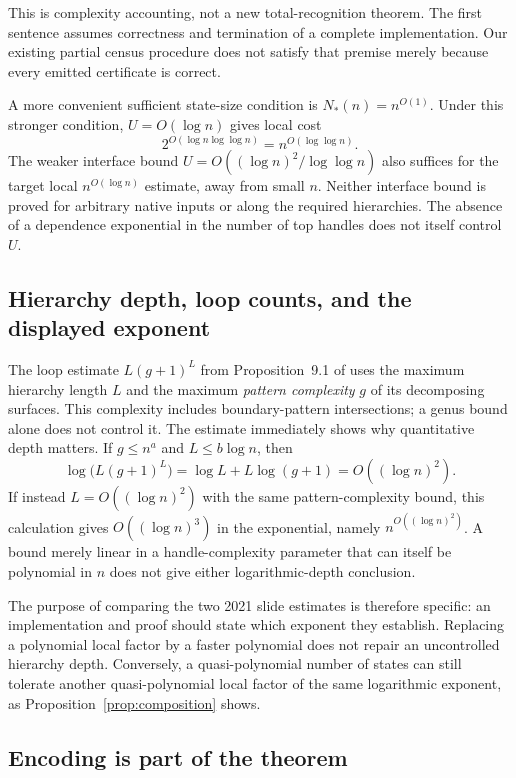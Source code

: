 This is complexity accounting, not a new total-recognition theorem.
The first sentence assumes correctness and termination of a complete
implementation.  Our existing partial census procedure does not satisfy
that premise merely because every emitted certificate is correct.

A more convenient sufficient state-size condition is $N_*(n)=n^{O(1)}$.
Under this stronger condition, $U=O(\log n)$ gives local cost
\[
 2^{O(\log n\log\log n)}=n^{O(\log\log n)}.
\]
The weaker interface bound
$U=O((\log n)^2/\log\log n)$ also suffices for the target local
$n^{O(\log n)}$ estimate, away from small $n$.  Neither interface bound
is proved for arbitrary native inputs or along the required hierarchies.
The absence of a dependence exponential in the number of top handles
does not itself control $U$.

\subsection{Hierarchy depth, loop counts, and the displayed exponent}

The loop estimate $L(g+1)^L$ from Proposition~9.1 of
\cite{Lackenby2026} uses the maximum hierarchy length $L$ and the maximum
\emph{pattern complexity} $g$ of its decomposing surfaces.  This complexity
includes boundary-pattern intersections; a genus bound alone does not
control it.  The estimate immediately shows why quantitative depth
matters.  If $g\le n^a$ and $L\le b\log n$, then
\[
 \log\bigl(L(g+1)^L\bigr)
 =\log L+L\log(g+1)=O((\log n)^2).
\]
If instead $L=O((\log n)^2)$ with the same pattern-complexity bound, this calculation
gives $O((\log n)^3)$ in the exponential, namely
$n^{O((\log n)^2)}$.  A bound merely linear in a handle-complexity
parameter that can itself be polynomial in $n$ does not give either
logarithmic-depth conclusion.

The purpose of comparing the two 2021 slide estimates is therefore
specific: an implementation and proof should state which exponent they
establish.  Replacing a polynomial local factor by a faster polynomial
does not repair an uncontrolled hierarchy depth.  Conversely, a
quasi-polynomial number of states can still tolerate another
quasi-polynomial local factor of the same logarithmic exponent, as
Proposition~\ref{prop:composition} shows.

\subsection{Encoding is part of the theorem}

